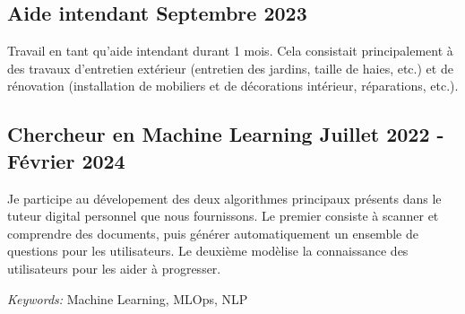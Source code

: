 
\subsection{Aide intendant \hfill Septembre 2023}
\vspace{0.7\baselineskip}

Travail en tant qu'aide intendant durant 1 mois. Cela consistait principalement à des travaux d'entretien extérieur
(entretien des jardins, taille de haies, etc.) et de rénovation (installation de mobiliers et de décorations
intérieur, réparations, etc.).


\vspace{0.35\baselineskip}

\subsection{Chercheur en Machine Learning \hfill Juillet 2022 - Février 2024}
\vspace{0.7\baselineskip}

Je participe au dévelopement des deux algorithmes principaux présents dans le tuteur digital personnel que nous
fournissons. Le premier consiste à scanner et comprendre des documents, puis générer automatiquement un ensemble de
questions pour les utilisateurs. Le deuxième modèlise la connaissance des utilisateurs pour les aider à progresser.

\textit{Keywords:} Machine Learning, MLOps, NLP
\vspace{0.35\baselineskip}




